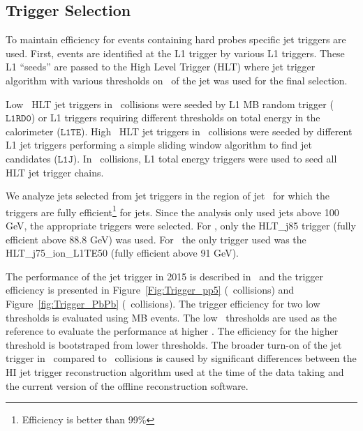 \subsection{Trigger Selection}



To maintain efficiency for events containing hard probes specific jet triggers are used.
First, events are identified at the L1 trigger by various L1 triggers.
These L1 ``seeds'' are passed to the High Level Trigger (HLT) where jet trigger algorithm with various thresholds on \pT\ of the jet was used for the final selection.


Low \pT\ HLT jet triggers in \pp\ collisions were seeded by L1 MB random trigger ($\texttt{L1RD0}$) or L1 triggers requiring different thresholds on total energy in the calorimeter ($\texttt{L1TE}$).
High \pT\ HLT jet triggers in \pp\ collisions were seeded by different L1 jet triggers performing a simple sliding window algorithm to find jet candidates ($\texttt{L1J}$).
In \PbPb\ collisions, L1 total energy triggers were used to seed all HLT jet trigger chains.

We analyze jets selected from jet triggers in the region of jet \pt\ for which the triggers are fully efficient\footnote{Efficiency is better than 99\%} for jets.
Since the analysis only used jets above 100 GeV, the appropriate triggers were selected.
For \pp, only the {\footnotesize{HLT\_j85}} trigger (fully efficient above 88.8 GeV) was used.
For \pbpb\, the only trigger used was the {\footnotesize{HLT\_j75\_ion\_L1TE50}} (fully efficient above 91 GeV).
   
  The performance of the jet trigger in 2015 is described in~\cite{HITMF} and the trigger efficiency is presented in Figure~\ref{Fig:Trigger_pp5} (\pp\ collisions) and Figure~\ref{fig:Trigger_PbPb} (\pbpb\ collisions).
The trigger efficiency for two low thresholds is evaluated using MB events.
The low \pT\ thresholds are used as the reference to evaluate the performance at higher \pT.
The efficiency for the higher threshold is bootstraped from lower thresholds.
The broader turn-on of the jet trigger in \pbpb\ compared to \pp\ collisions is caused by significant differences between the HI jet trigger reconstruction algorithm used at the time of the data taking and the current version of the offline reconstruction software.

